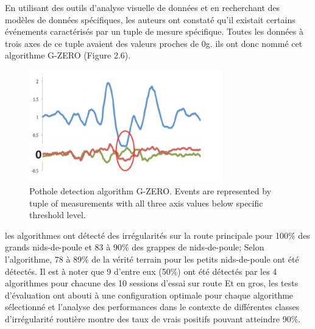       En utilisant des outils d'analyse visuelle de données et en recherchant des modèles de données spécifiques, les auteurs ont constaté qu'il existait certains événements caractérisés par un tuple de mesure spécifique. Toutes les données à trois axes de ce tuple avaient des valeurs proches de 0g. ils ont donc nommé cet algorithme G-ZERO (Figure 2.6).\newline


   \begin{figure}[h!]
      \center
      \includegraphics[width=0.75\textwidth]{Images/chapter2/relatedWork6.PNG}
     \caption{Pothole detection algorithm G-ZERO. Events are represented by tuple
     of measurements with all three axis values below specific threshold level.}
     \label{fig:graph}
      \end{figure}

      
les algorithmes ont détecté des irrégularités sur la route principale pour 100\% des grands nids-de-poule et 83 à 90\% des grappes de nids-de-poule; Selon l'algorithme, 78 à 89\% de la vérité terrain pour les petits nids-de-poule ont été détectés. Il est à noter que 9 d'entre eux (50\%) ont été détectés par les 4 algorithmes pour chacune des 10 sessions d'essai sur route
Et en gros, les tests d'évaluation ont abouti à une configuration optimale pour chaque algorithme sélectionné et l'analyse des performances dans le contexte de différentes classes d'irrégularité routière montre des taux de vrais positifs pouvant atteindre 90\%.
